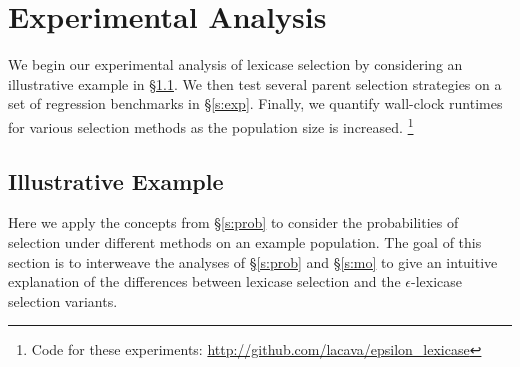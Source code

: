 \documentclass[twoside]{article}
\newcommand{\edit}[1]{{\color{red} #1}}
\begin{document}
%
%
%

\edit{\section{Experimental Analysis}}
\edit{We begin our experimental analysis of lexicase selection by considering an illustrative example in \S\ref{s:ex}. We then test several parent selection strategies on a set of regression benchmarks in \S\ref{s:exp}. Finally, we quantify wall-clock runtimes for various selection methods as the population size is increased. \footnote{\edit{Code for these experiments: \url{http://github.com/lacava/epsilon_lexicase}}}}
\subsection{Illustrative Example}\label{s:ex}
Here we apply the concepts from \S\ref{s:prob} to consider the probabilities of selection under different methods on an example population. The goal of this section is to interweave the analyses of \S\ref{s:prob} and \S\ref{s:mo} to give an intuitive explanation of the differences between lexicase selection and the $\epsilon$-lexicase selection variants. 
\end{document}
